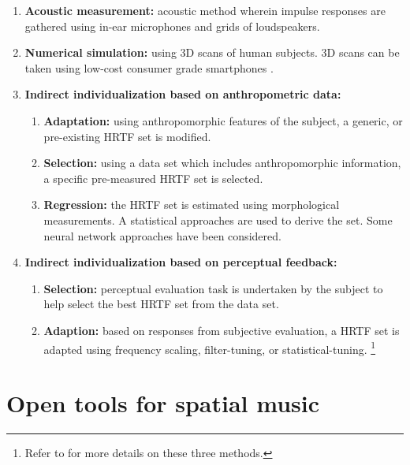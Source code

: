 \begin{enumerate}
    \item \textbf{Acoustic measurement:} acoustic method wherein impulse responses are gathered using in-ear microphones and grids of loudspeakers. 
    \item \textbf{Numerical simulation:} using 3D scans of human subjects. 3D scans can be taken using low-cost consumer grade smartphones \cite{kaneko2016deepearnet}. 
    \item \textbf{Indirect individualization based on anthropometric data:} 
    \begin{enumerate}
        \item \textbf{Adaptation:} using anthropomorphic features of the subject, a generic, or pre-existing HRTF set is modified. 
        \item \textbf{Selection:} using a data set which includes anthropomorphic information, a specific pre-measured HRTF set is selected. 
        \item \textbf{Regression:} the HRTF set is estimated using morphological measurements. A statistical approaches are used to derive the set. Some neural network approaches have been considered.
    \end{enumerate}
    \item \textbf{Indirect individualization based on perceptual feedback:} 
    \begin{enumerate}
        \item \textbf{Selection:} perceptual evaluation task is undertaken by the subject to help select the best HRTF set from the data set.
        \item \textbf{Adaption:} based on responses from subjective evaluation, a HRTF set is adapted using frequency scaling, filter-tuning, or statistical-tuning. \footnote{Refer to \cite{guezenoc2020hrtf} for more details on these three methods.} 
    \end{enumerate}
\end{enumerate}




\section{Open tools for spatial music}\label{sec:open_tools_spat_mus}

